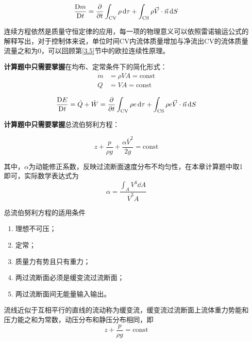
\begin{equation}
	\dfrac{\mathrm{D} m}{\mathrm{D} t} = \pdv{t} \int_{\text{CV}} \rho \dd{\tau} + \int_{\text{CS}} \rho \vec{V} \cdot \vec{n} \dd{S} 
\end{equation}

连续方程依然是质量守恒定律的应用，每一项的物理意义可以依照雷诺输运公式的解释写出，对于控制体来说，单位时间CV内流体质量增加与净流出CV的流体质量流量之和为0，可以回顾第\ref{3.5}节中的欧拉连续性原理。

\textbf{计算题中只需要掌握}在均布、定常条件下的简化形式：
\begin{equation}
	\begin{split}
		\dot{m} &= \rho V A = \text{const} \\
		Q &= V A = \text{const}
	\end{split}
\end{equation}


\begin{equation}
	\dfrac{\mathrm{D} E}{\mathrm{D} t} = \dot{Q} + \dot{W} = \pdv{t} \int_{\text{CV}} \rho e \dd{\tau} + \int_{\text{CS}} \rho e \vec{V} \cdot \vec{n} \dd{S} 
\end{equation}

\textbf{计算题中只需要掌握}总流伯努利方程：

\begin{equation}
	z + \dfrac{p}{\rho g} + \dfrac{\alpha \overline{V}^2}{2 g} = \text{const}
\end{equation}

其中，$\alpha$为动能修正系数，反映过流断面速度分布不均匀性，在本章计算题中取1即可，实际数学表达式为
\begin{equation}
	\alpha = \dfrac{\displaystyle \int_{A} V^3 \dd{A}}{\overline{V}^3 A}
\end{equation}

总流伯努利方程的适用条件
\begin{enumerate}
	\item 理想不可压；
	\item 定常；
	\item 质量力有势且只有重力；
	\item 两过流断面必须是缓变流过流断面；
	\item 两过流断面间无能量输入输出。
\end{enumerate}

\begin{definition}[缓变流]
	流线近似于互相平行的直线的流动称为缓变流，缓变流过流断面上流体重力势能和压力能之和为常数，动压分布和静压分布相同，即
	\begin{equation}
		z + \dfrac{p}{\rho g} = \text{const}
	\end{equation}
\end{definition}

